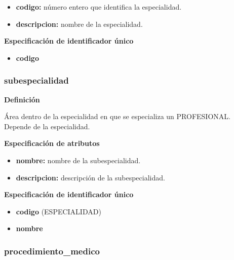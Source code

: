 \documentclass[a4paper,11pt]{article}
\begin{document}
\begin{itemize}

     \item \textbf{codigo:} número entero que identifica la especialidad.

     \item \textbf{descripcion:} nombre de la especialidad.

\end{itemize}

\textbf{Especificación de identificador único}

\begin{itemize}

     \item \textbf{codigo}

\end{itemize}

\subsubsection{\textbf{subespecialidad}}

\textbf{Definición}

Área dentro de la especialidad en que se especializa un PROFESIONAL. Depende de 
la especialidad.

\textbf{Especificación de atributos}

\begin{itemize}

     \item \textbf{nombre:} nombre de la subespecialidad.

     \item \textbf{descripcion:} descripción de la subespecialidad.

\end{itemize}

\textbf{Especificación de identificador único}

\begin{itemize}

     \item \textbf{codigo} (ESPECIALIDAD)

     \item \textbf{nombre}

\end{itemize}

\subsubsection{\textbf{procedimiento\_medico}}
\end{document}
